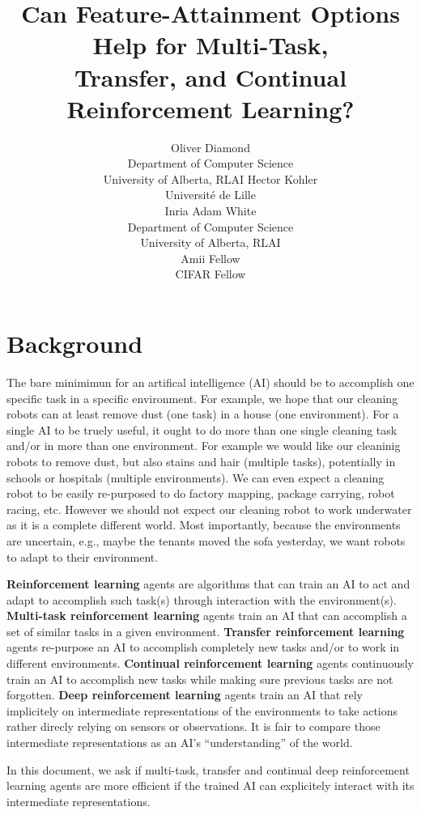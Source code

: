 \documentclass[10pt]{article} %
\title{Can Feature-Attainment Options Help for Multi-Task,\\Transfer, and Continual Reinforcement Learning?}
\author{\name Oliver Diamond  \\
      \addr Department of Computer Science\\
      University of Alberta, RLAI
      \AND
      \name Hector Kohler  \\
      \addr Universit\'e de Lille \\
      Inria
      \AND
      \name Adam White \\
      \addr Department of Computer Science \\
      University of Alberta, RLAI\\
      Amii Fellow \\
      CIFAR Fellow}
\begin{document}
\maketitle

\section{Background}
The bare minimimun for an artifical intelligence (AI) should be to accomplish one specific task in a specific environment.
For example, we hope that our cleaning robots can at least remove dust (one task) in a house (one environment).
For a single AI to be truely useful, it ought to do more than one single cleaning task and/or in more than one environment.
For example we would like our cleaninig robots to remove dust, but also stains and hair (multiple tasks), potentially in schools or hospitals (multiple environments).
We can even expect a cleaning robot to be easily re-purposed to do factory mapping, package carrying, robot racing, etc.
However we should not expect our cleaning robot to work underwater as it is a complete different world.
Most importantly, because the environments are uncertain, e.g., maybe the tenants moved the sofa yesterday, we want robots to adapt to their environment.

\textbf{Reinforcement learning} agents are algorithms that can train an AI to act and adapt to accomplish such task(s) through interaction with the environment(s).
\textbf{Multi-task reinforcement learning} agents train an AI that can accomplish a set of similar tasks in a given environment.
\textbf{Transfer reinforcement learning} agents re-purpose an AI to accomplish completely new tasks and/or to work in different environments.
\textbf{Continual reinforcement learning} agents continuously train an AI to accomplish new tasks while making sure previous tasks are not forgotten.
\textbf{Deep reinforcement learning} agents train an AI that rely implicitely on intermediate representations of the environments to take actions rather direcly relying on sensors or observations.
It is fair to compare those intermediate representations as an AI's ``understanding'' of the world.

In this document, we ask if multi-task, transfer and continual deep reinforcement learning agents are more efficient if the trained AI can explicitely interact with its intermediate representations.
\end{document}
